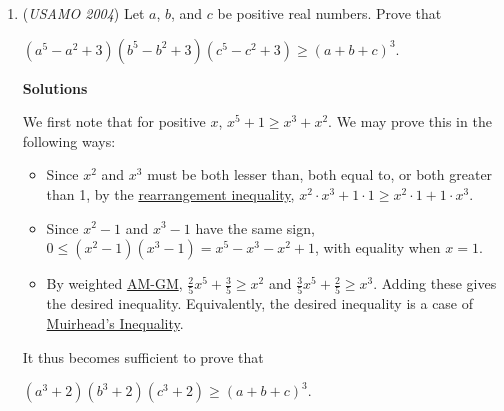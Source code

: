 \begin{enumerate}
 
<i>Alternate solutions are always welcome. If you have a different, elegant solution to this problem, please \href{https://artofproblemsolving.com/wiki/index.php?title=2004\_USAMO\_Problems/Problem\_4&action=edit}{add it} to this page.</i>

 \textbf{Resources} 


	\item (\textit{USAMO 2004}) Let $a$, $b$, and $c$ be positive real numbers.  Prove that


 
$(a^5 - a^2 + 3)(b^5 - b^2 + 3)(c^5 - c^2 + 3) \ge (a+b+c)^3$.


 


 



\textbf{Solutions}

We first note that for positive $x$, $x^5 + 1 \ge x^3 + x^2$.  We may prove this in the following ways:

 
            \begin{itemize}
        \item Since $x^2$ and $x^3$ must be both lesser than, both equal to, or both greater than 1, by the \href{https://artofproblemsolving.com/wiki/index.php?title=Rearrangement\_inequality}{rearrangement inequality}, $x^2 \cdot x^3 + 1 \cdot 1 \ge x^2 \cdot 1 + 1 \cdot x^3$.
            \end{itemize}
            
            \begin{itemize}
        \item Since $x^2 - 1$ and $x^3 - 1$ have the same sign, $0 \le (x^2 - 1)(x^3 - 1) = x^5 - x^3 - x^2 + 1$, with equality when $x = 1$.
            \end{itemize}
            
            \begin{itemize}
        \item By weighted \href{https://artofproblemsolving.com/wiki/index.php?title=AM-GM}{AM-GM}, $\frac{2}{5}x^5 + \frac{3}{5} \ge x^2$ and $\frac{3}{5}x^5 + \frac{2}{5} \ge x^3$.  Adding these gives the desired inequality.  Equivalently, the desired inequality is a case of \href{https://artofproblemsolving.com/wiki/index.php?title=Muirhead\%27s\_Inequality}{Muirhead's Inequality}.
            \end{itemize}
            It thus becomes sufficient to prove that

 $(a^3 + 2)(b^3 + 2)(c^3 + 2) \ge (a+b+c)^3$.


\end{enumerate}

